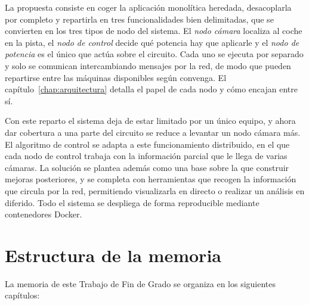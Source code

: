 La propuesta consiste en coger la aplicación monolítica heredada, desacoplarla por completo y repartirla en tres funcionalidades bien delimitadas, que se convierten en los tres tipos de nodo del sistema. El \emph{nodo cámara} localiza al coche en la pista, el \emph{nodo de control} decide qué potencia hay que aplicarle y el \emph{nodo de potencia} es el único que actúa sobre el circuito. Cada uno se ejecuta por separado y solo se comunican intercambiando mensajes por la red, de modo que pueden repartirse entre las máquinas disponibles según convenga. 
El capítulo~\ref{chap:arquitectura} detalla el papel de cada nodo y cómo encajan entre sí.

Con este reparto el sistema deja de estar limitado por un único equipo, y ahora dar cobertura a una parte del circuito se reduce a levantar un nodo cámara más. El algoritmo de control se adapta a este funcionamiento distribuido, en el que cada nodo de control trabaja con la información parcial que le llega de varias cámaras. La solución se plantea además como una base sobre la que construir mejoras posteriores, y se completa con herramientas que recogen la información que circula por la red, permitiendo visualizarla en directo o realizar un análisis en diferido. Todo el sistema se despliega de forma reproducible mediante contenedores Docker.

\section{Estructura de la memoria}
\label{sec:estrutura}

La memoria de este Trabajo de Fin de Grado se organiza en los siguientes capítulos:

